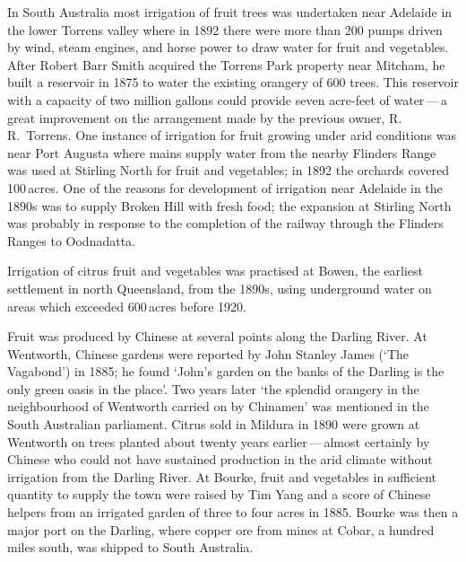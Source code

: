 In South Australia  most irrigation of fruit
trees was undertaken near Adelaide in the lower Torrens valley
 where in 1892 there were more than 200 pumps
driven by wind, steam engines, and horse power to draw water for fruit
and vegetables.  After Robert Barr Smith 
acquired the Torrens Park  property near Mitcham,
 he built a reservoir
 in
1875 to water the existing orangery of 600 trees.  This reservoir with
a capacity of two million gallons could provide seven acre-feet of
water\,---\,a great improvement on the arrangement made by the
previous owner, R.\,R.~Torrens.  One instance
of irrigation for fruit growing under arid conditions was near Port
Augusta  where mains supply water from the
nearby Flinders Range  was used at Stirling
North  for fruit and vegetables; in 1892 the
orchards covered 100\,acres.  One of the reasons for development of
irrigation near Adelaide in the 1890s was to supply Broken Hill
 with fresh food; the expansion at Stirling North
was probably in response to the completion of the railway through the
Flinders Ranges to Oodnadatta.

Irrigation of citrus fruit and vegetables was practised at Bowen,
 the earliest settlement in north Queensland, from the
1890s, using underground water on areas which exceeded 600\,acres
before 1920.

Fruit was produced by Chinese  at several points along
the Darling River.   At Wentworth,
 Chinese
gardens were reported by John Stanley James 
(`The Vagabond') in 1885; he found `John's garden on the banks of the
Darling is the only green oasis in the place'. Two years later `the
splendid orangery in the neighbourhood of Wentworth carried on by
Chinamen' was mentioned in the South Australian parliament.  Citrus
sold in Mildura  in 1890 were grown at Wentworth
on trees planted about twenty years earlier\,---\,almost certainly by
Chinese who could not have sustained production in the arid climate
without irrigation from the Darling River.  At
Bourke,  fruit and vegetables in sufficient
quantity to supply the town were raised by Tim Yang and a score of
Chinese helpers from an irrigated garden of three to four acres in
1885.  Bourke was then a major port on the Darling, where copper ore
from mines at Cobar,
 a hundred miles south, was shipped to South
Australia.

